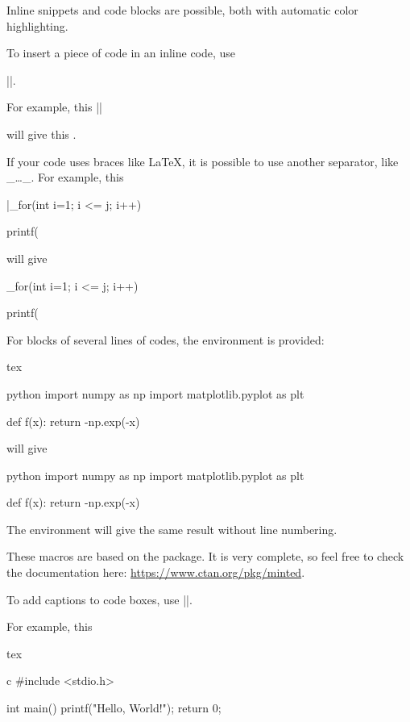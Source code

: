 \documentclass[a4paper, 11pt]{old-dms}
\begin{document}
Inline snippets and code blocks are possible, both with automatic color highlighting.

To insert a piece of code in an inline code, use

||.

For example, this ||

will give this .

If your code uses braces like \LaTeX{}, it is possible to use another separator, like \_\dots\_. For example, this 

|_for(int i=1; i <= j; i++){printf(%

will give

_for(int i=1; i <= j; i++){printf(%

For blocks of several lines of codes, the environment  is provided:

\begin{codeboxnonos}{tex}
\begin{codebox}{python}
import numpy as np
import matplotlib.pyplot as plt

def f(x):
    return -np.exp(-x)
\end{codebox}
\end{codeboxnonos}

will give

\begin{codebox}{python}
import numpy as np
import matplotlib.pyplot as plt

def f(x):
    return -np.exp(-x)
\end{codebox}

The environment  will give the same result without line numbering.

These macros are based on the  package. It is very complete, so feel free to check the documentation here: \url{https://www.ctan.org/pkg/minted}.

To add captions to code boxes, use
||.

For example, this
\begin{codeboxnonos}{tex}
\begin{codebox}{c}
#include <stdio.h>

int main() {
    printf("Hello, World!");
    return 0;
}
\end{codebox}
\end{codeboxnonos}

}}
\end{document}

